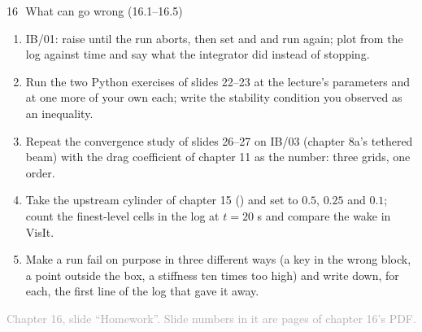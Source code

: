 \documentclass[aspectratio=169,11pt]{beamer}
\newcommand{\sourcecredit}[1]{\vfill\begin{flushright}\tiny\textcolor{DarkGray}{#1}\end{flushright}}
\begin{document}
\begin{frame}{16\,\textbullet\ What can go wrong (16.1--16.5)}
\label{fr:c16x1}
\footnotesize
\begin{enumerate}
  \item[16.1] IB/01: raise  until the run aborts, then set  and  and run again; plot  from the log against time and say what the integrator did instead of stopping.
  \item[16.2] Run the two Python exercises of slides 22--23 at the lecture's parameters and at one more of your own each; write the stability condition you observed as an inequality.
  \item[16.3] Repeat the convergence study of slides 26--27 on IB/03 (chapter 8a's tethered beam) with the drag coefficient of chapter 11 as the number: three grids, one order.
  \item[16.4] Take the upstream cylinder of chapter 15 () and set  to $0.5$, $0.25$ and $0.1$; count the finest-level cells in the log at $t = 20$ s and compare the wake in VisIt.
  \item[16.5] Make a run fail on purpose in three different ways (a key in the wrong block, a point outside the box, a stiffness ten times too high) and write down, for each, the first line of the log that gave it away.
\end{enumerate}
\sourcecredit{Chapter 16, slide ``Homework''. Slide numbers in it are pages of chapter 16's PDF.}
\end{frame}
\end{document}
